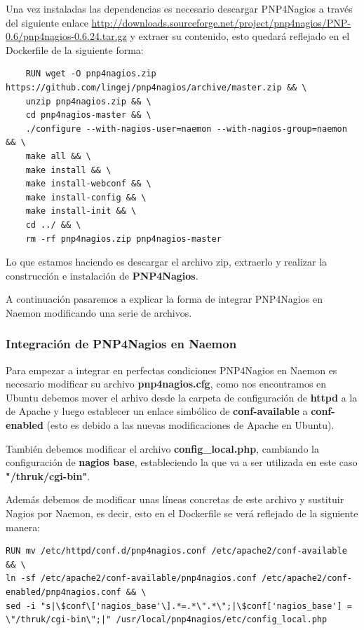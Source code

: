 Una vez instaladas las dependencias es necesario descargar PNP4Nagios a través del siguiente enlace \url{http://downloads.sourceforge.net/project/pnp4nagios/PNP-0.6/pnp4nagios-0.6.24.tar.gz} y extraer su contenido, esto quedará reflejado en el Dockerfile de la siguiente forma:

\begin{lstlisting}
	RUN wget -O pnp4nagios.zip https://github.com/lingej/pnp4nagios/archive/master.zip && \
	unzip pnp4nagios.zip && \
	cd pnp4nagios-master && \
	./configure --with-nagios-user=naemon --with-nagios-group=naemon && \
	make all && \
	make install && \
	make install-webconf && \
	make install-config && \
	make install-init && \
	cd ../ && \
	rm -rf pnp4nagios.zip pnp4nagios-master
\end{lstlisting}
Lo que estamos haciendo es descargar el archivo zip, extraerlo y realizar la construcción e instalación de \textbf{PNP4Nagios}.

A continuación pasaremos a explicar la forma de integrar PNP4Nagios en Naemon modificando una serie de archivos.
\newpage
\subsubsection{Integración de PNP4Nagios en Naemon}

Para empezar a integrar en perfectas condiciones PNP4Nagios en Naemon es necesario modificar su archivo \textbf{pnp4nagios.cfg}, como nos encontramos en Ubuntu debemos mover el arhivo desde la carpeta de configuración de \textbf{httpd} a la de Apache y luego establecer un enlace simbólico de \textbf{conf-available} a \textbf{conf-enabled} (esto es debido a las nuevas modificaciones de Apache en Ubuntu).

También debemos modificar el archivo \textbf{config\_local.php}, cambiando la configuración de \textbf{nagios base}, estableciendo la que va a ser utilizada en este caso \textbf{"/thruk/cgi-bin"}.

Además debemos de modificar unas líneas concretas de este archivo y sustituir Nagios por Naemon, es decir, esto en el Dockerfile se verá reflejado de la siguiente manera:

\begin{lstlisting}
RUN mv /etc/httpd/conf.d/pnp4nagios.conf /etc/apache2/conf-available && \
ln -sf /etc/apache2/conf-available/pnp4nagios.conf /etc/apache2/conf-enabled/pnp4nagios.conf && \
sed -i "s|\$conf\['nagios_base'\].*=.*\".*\";|\$conf['nagios_base'] = \"/thruk/cgi-bin\";|" /usr/local/pnp4nagios/etc/config_local.php 

\end{lstlisting}

